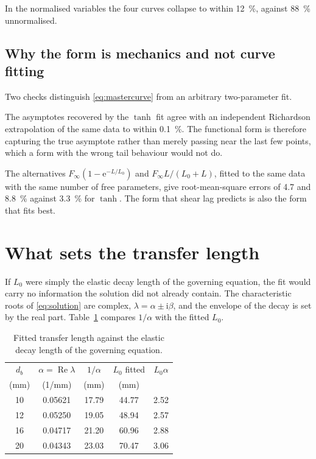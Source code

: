 In the normalised variables the four curves collapse to within
\SI{12}{\percent}, against \SI{88}{\percent} unnormalised.

\subsection{Why the form is mechanics and not curve fitting}

Two checks distinguish \eqref{eq:mastercurve} from an arbitrary two-parameter
fit.

The asymptotes recovered by the $\tanh$ fit agree with an independent
Richardson extrapolation of the same data to within \SI{0.1}{\percent}. The
functional form is therefore capturing the true asymptote rather than merely
passing near the last few points, which a form with the wrong tail behaviour
would not do.

The alternatives $F_\infty(1-\mathrm{e}^{-L/L_0})$ and
$F_\infty L/(L_0+L)$, fitted to the same data with the same number of free
parameters, give root-mean-square errors of \SI{4.7}{} and
\SI{8.8}{\percent} against \SI{3.3}{\percent} for $\tanh$. The form that
shear lag predicts is also the form that fits best.


\section{What sets the transfer length}
\label{sec:transferlength}

If $L_0$ were simply the elastic decay length of the governing equation, the
fit would carry no information the solution did not already contain. The
characteristic roots of \eqref{eq:solution} are complex,
$\lambda = \alpha \pm \mathrm{i}\beta$, and the envelope of the decay is set
by the real part. Table~\ref{tab:translength} compares $1/\alpha$ with the
fitted $L_0$.

\begin{table}[H]
\centering
\caption{Fitted transfer length against the elastic decay length of the
         governing equation.}
\label{tab:translength}
\small
\begin{tabular*}{\linewidth}{@{\extracolsep{\fill}}ccccc@{}}
\hline
$d_b$ & $\alpha = \operatorname{Re}\lambda$ & $1/\alpha$ & $L_0$ fitted
      & $L_0 \alpha$ \\
(mm)  & (1/mm)                              & (mm)       & (mm) & \\
\hline
10 & 0.05621 & 17.79 & 44.77 & 2.52 \\
12 & 0.05250 & 19.05 & 48.94 & 2.57 \\
16 & 0.04717 & 21.20 & 60.96 & 2.88 \\
20 & 0.04343 & 23.03 & 70.47 & 3.06 \\
\hline
\end{tabular*}
\end{table}

